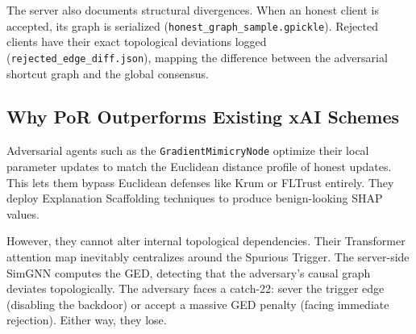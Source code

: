 \documentclass[journal]{IEEEtran}
\begin{document}
The server also documents structural divergences. When an honest client is accepted, its graph is serialized (\texttt{honest\_graph\_sample.gpickle}). Rejected clients have their exact topological deviations logged (\texttt{rejected\_edge\_diff.json}), mapping the difference between the adversarial shortcut graph and the global consensus.

\subsection{Why PoR Outperforms Existing xAI Schemes}

Adversarial agents such as the \texttt{GradientMimicryNode} optimize their local parameter updates to match the Euclidean distance profile of honest updates. This lets them bypass Euclidean defenses like Krum or FLTrust entirely. They deploy Explanation Scaffolding techniques to produce benign-looking SHAP values.

However, they cannot alter internal topological dependencies. Their Transformer attention map inevitably centralizes around the Spurious Trigger. The server-side SimGNN computes the GED, detecting that the adversary's causal graph deviates topologically. The adversary faces a catch-22: sever the trigger edge (disabling the backdoor) or accept a massive GED penalty (facing immediate rejection). Either way, they lose.
\end{document}

